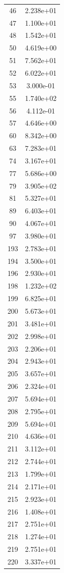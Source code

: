 \documentclass[12pt]{article}
\begin{document}
\begin{longtable}{@{}cc@{}}
46 & 2.238e+01 \\
47 & 1.100e+01 \\
48 & 1.542e+01 \\
50 & 4.619e+00 \\
51 & 7.562e+01 \\
52 & 6.022e+01 \\
53 & 3.000e-01 \\
55 & 1.740e+02 \\
56 & 4.112e-01 \\
57 & 4.646e+00 \\
60 & 8.342e+00 \\
63 & 7.283e+01 \\
74 & 3.167e+01 \\
77 & 5.686e+00 \\
79 & 3.905e+02 \\
81 & 5.327e+01 \\
89 & 6.403e+01 \\
90 & 4.067e+01 \\
97 & 3.980e+01 \\
193 & 2.783e+01 \\
194 & 3.500e+01 \\
196 & 2.930e+01 \\
198 & 1.232e+02 \\
199 & 6.825e+01 \\
200 & 5.673e+01 \\
201 & 3.481e+01 \\
202 & 2.998e+01 \\
203 & 2.206e+01 \\
204 & 2.943e+01 \\
205 & 3.657e+01 \\
206 & 2.324e+01 \\
207 & 5.694e+01 \\
208 & 2.795e+01 \\
209 & 5.694e+01 \\
210 & 4.636e+01 \\
211 & 3.112e+01 \\
212 & 2.744e+01 \\
213 & 1.799e+01 \\
214 & 2.171e+01 \\
215 & 2.923e+01 \\
216 & 1.408e+01 \\
217 & 2.751e+01 \\
218 & 1.274e+01 \\
219 & 2.751e+01 \\
220 & 3.337e+01 \\

\end{longtable}
\end{document}
